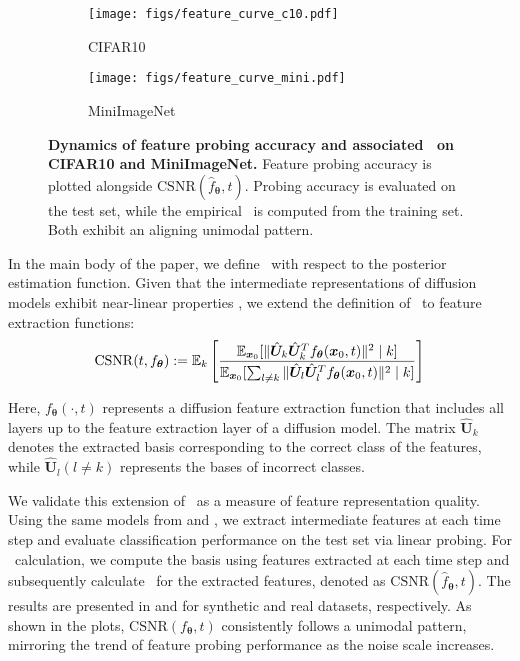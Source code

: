 \begin{figure*}[h]
\begin{center}
    \begin{subfigure}{0.48\textwidth}
    \texttt{[image: figs/feature\_curve\_c10.pdf]}
    \caption{CIFAR10} 
    \end{subfigure} \quad %
    \begin{subfigure}{0.48\textwidth}
    \texttt{[image: figs/feature\_curve\_mini.pdf]}
    \caption{MiniImageNet} 
    \end{subfigure}

    \end{center}
\caption{\textbf{Dynamics of feature probing accuracy and associated \CSNR~on CIFAR10 and MiniImageNet.} Feature probing accuracy is plotted alongside $\mathrm{CSNR}(\hat{f}_{\bm \theta},t)$. Probing accuracy is evaluated on the test set, while the empirical \CSNR~is computed from the training set. Both exhibit an aligning unimodal pattern.}
\label{fig:cifar_2}
\end{figure*}

In the main body of the paper, we define \CSNR~with respect to the posterior estimation function. Given that the intermediate representations of diffusion models exhibit near-linear properties \citep{kwon2022diffusion}, we extend the definition of \CSNR~to feature extraction functions:
\begin{align*}
    \mathrm{CSNR}(t, f_{\bm \theta}) := \operatorname{\mathbb{E}}_k \left[\frac{\operatorname{\mathbb{E}}_{\bm x_0}[\|\hat{\bm U}_k\hat{\bm U}_k^Tf_{\bm \theta}(\bm x_0, t)\|^2 \mid k]}{\operatorname{\mathbb{E}}_{\bm x_0}[\sum_{l\neq k}\|\hat{\bm U}_l\hat{\bm U}_l^Tf_{\bm \theta}(\bm x_0, t)\|^2 \mid k]} \right]
\end{align*}

Here, $f_{\bm \theta}(\cdot, t)$ represents a diffusion feature extraction function that includes all layers up to the feature extraction layer of a diffusion model. The matrix $\hat{\bm U}_k$ denotes the extracted basis corresponding to the correct class of the features, while $\hat{\bm U}_l (l \neq k)$ represents the bases of incorrect classes. 

We validate this extension of \CSNR~as a measure of feature representation quality. Using the same models from  and , we extract intermediate features at each time step and evaluate classification performance on the test set via linear probing. For \CSNR~calculation, we compute the basis using features extracted at each time step and subsequently calculate \CSNR~for the extracted features, denoted as $\mathrm{CSNR}(\hat{f}_{\bm \theta},t)$. The results are presented in  and  for synthetic and real datasets, respectively. As shown in the plots, $\mathrm{CSNR}(f_{\bm \theta},t)$ consistently follows a unimodal pattern, mirroring the trend of feature probing performance as the noise scale increases.



